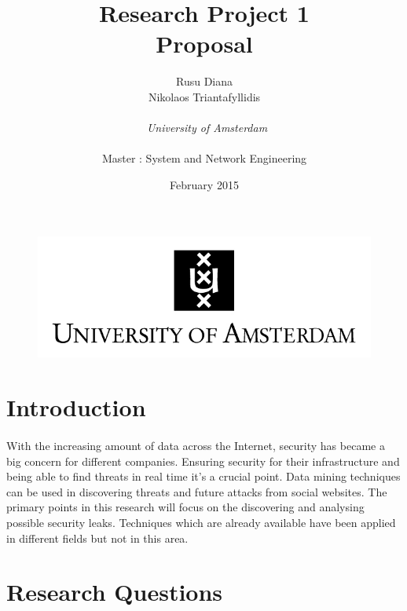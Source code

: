 \documentclass[11pt]{report}
\begin{document}
\begin{figure}[!t]
\centering
\includegraphics{images/uva.jpeg}
\end{figure}
\title{\textbf{Research Project 1 
} \\ Proposal}
\author{Rusu Diana \\ Nikolaos Triantafyllidis\\ \\
~\emph{University of Amsterdam 
        } \\ \\Master : System and Network Engineering}


\date{February 2015}

\maketitle

\tableofcontents

\newpage

\section*{Introduction}
\paragraph{}
With the increasing amount of data across the Internet, security has became a big concern for different companies. Ensuring security for their infrastructure and being able to find threats in real time it's a crucial point. Data mining techniques can be used in discovering threats and future attacks from social websites. The primary points in this research will focus on the discovering and analysing possible security leaks. Techniques which are already available have been applied in different fields but not in this area.

\section{Research Questions}
\end{document}
